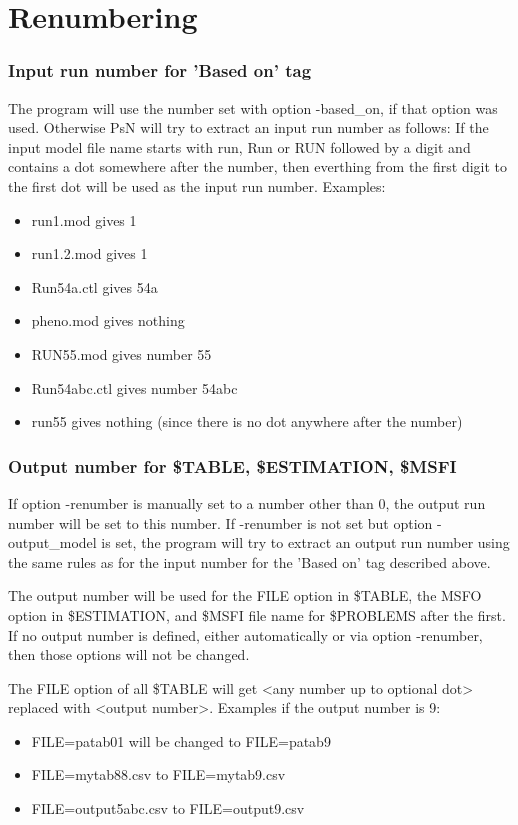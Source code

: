 \section{Renumbering}
\subsubsection*{Input run number for 'Based on' tag}
The program will use the number set with option -based\_on, if that option was used.
Otherwise PsN will try to extract an input run number as follows: If the input model file name
starts with run, Run or RUN followed by a digit and contains a dot 
somewhere after the number, then everthing from the first digit to the first dot will be used as the input run number. Examples:
\begin{itemize}
\item run1.mod gives 1
\item run1.2.mod gives 1
\item Run54a.ctl gives 54a
\item pheno.mod gives nothing
\item RUN55.mod gives number 55
\item Run54abc.ctl gives number 54abc
\item run55 gives nothing (since there is no dot anywhere after the number)
\end{itemize}
\subsubsection*{Output number for \$TABLE, \$ESTIMATION, \$MSFI}
If option -renumber is manually set to a number other than 0, the output run number will
be set to this number. If -renumber is not set but option -output\_model is set,
the program will try to extract an output run number using the same rules
as for the input number for the 'Based on' tag described above.

The output number will be used for the FILE option in \$TABLE, the MSFO option in
\$ESTIMATION, and \$MSFI file name for \$PROBLEMS after the first. 
If no output number is defined, either automatically or via option -renumber, 
then those options will not be changed.

The FILE option of all \$TABLE will get <any number up to optional dot> replaced with <output number>. 
Examples if the output number is 9:
\begin{itemize}
\item FILE=patab01 will be changed to FILE=patab9
\item FILE=mytab88.csv to FILE=mytab9.csv
\item FILE=output5abc.csv to FILE=output9.csv
\end{itemize}

